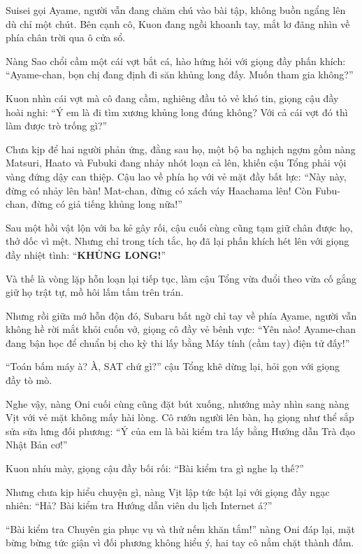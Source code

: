 \documentclass[../main.tex]{subfiles}
\begin{document}
Suisei gọi Ayame, người vẫn đang chăm chú vào bài tập, không buồn ngẩng lên dù chỉ một chút. Bên cạnh cô, Kuon đang ngồi khoanh tay, mắt lơ đãng nhìn về phía chân trời qua ô cửa sổ.

Nàng Sao chổi cầm một cái vợt bắt cá, hào hứng hỏi với giọng đầy phấn khích: ``Ayame-chan, bọn chị đang định đi săn khủng long đấy. Muốn tham gia không?''


Kuon nhìn cái vợt mà cô đang cầm, nghiêng đầu tỏ vẻ khó tin, giọng cậu đầy hoài nghi: ``Ý em là đi tìm xương khủng long đúng không? Với cả cái vợt đó thì làm được trò trống gì?''

Chưa kịp để hai người phản ứng, đằng sau họ, một bộ ba nghịch ngợm gồm nàng Matsuri, Haato và Fubuki đang nhảy nhót loạn cả lên, khiến cậu Tổng phải vội vàng đứng dậy can thiệp. Cậu lao về phía họ với vẻ mặt đầy bất lực: ``Này này, đừng có nhảy lên bàn! Mat-chan, đừng có xách váy Haachama lên! Còn Fubu-chan, đừng có giả tiếng khủng long nữa!''

Sau một hồi vật lộn với ba kẻ gây rối, cậu cuối cùng cũng tạm giữ chân được họ, thở dốc vì mệt. Nhưng chỉ trong tích tắc, họ đã lại phấn khích hét lên với giọng đầy nhiệt tình: ``\textbf{KHỦNG LONG!}''

Và thế là vòng lặp hỗn loạn lại tiếp tục, làm cậu Tổng vừa đuổi theo vừa cố gắng giữ họ trật tự, mồ hôi lấm tấm trên trán.

Nhưng rồi giữa mớ hỗn độn đó, Subaru bất ngờ chỉ tay về phía Ayame, người vẫn không hề rời mắt khỏi cuốn vở, giọng cô đầy vẻ bênh vực: ``Yên nào! Ayame-chan đang bận học để chuẩn bị cho kỳ thi lấy bằng Máy tính (cầm tay) điện tử đấy!''


``Toán bấm máy à? À, SAT chứ gì?'' cậu Tổng khẽ dừng lại, hỏi gọn với giọng đầy tò mò.

Nghe vậy, nàng Oni cuối cùng cũng đặt bút xuống, nhướng mày nhìn sang nàng Vịt với vẻ mặt không mấy hài lòng. Cô rướn người lên bàn, hạ giọng như thể sắp sửa sửa lưng đối phương: ``Ý của em là bài kiểm tra lấy bằng Hướng dẫn Trà đạo Nhật Bản cơ!''

Kuon nhíu mày, giọng cậu đầy bối rối: ``Bài kiểm tra gì nghe lạ thế?''

Nhưng chưa kịp hiểu chuyện gì, nàng Vịt lập tức bật lại với giọng đầy ngạc nhiên: ``Hả? Bài kiểm tra Hướng dẫn viên du lịch Internet á?''

``Bài kiểm tra Chuyên gia phục vụ và thử nếm khăn tắm!'' nàng Oni đáp lại, mặt bừng bừng tức giận vì đối phương không hiểu ý, hai tay cô nắm chặt thành đấm.
\end{document}
